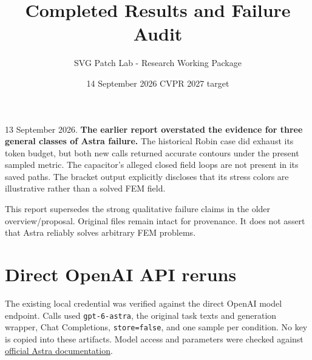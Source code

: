 \documentclass[
  11pt,
  a4paper,
]{article}
\title{Completed Results and Failure Audit}
\author{SVG Patch Lab - Research Working Package}
\date{14 September 2026 \textbar{} CVPR 2027 target}
\let\originaltableofcontents\tableofcontents
\renewcommand{\tableofcontents}{\originaltableofcontents\clearpage}
\begin{document}
\maketitle

{
\setcounter{tocdepth}{2}
\tableofcontents
}
13 September 2026. \textbf{The earlier report overstated the evidence
for three general classes of Astra failure.} The historical Robin case
did exhaust its token budget, but both new calls returned accurate
contours under the present sampled metric. The capacitor's alleged
closed field loops are not present in its saved paths. The bracket
output explicitly discloses that its stress colors are illustrative
rather than a solved FEM field.

This report supersedes the strong qualitative failure claims in the
older overview/proposal. Original files remain intact for provenance. It
does not assert that Astra reliably solves arbitrary FEM problems.

\section{Direct OpenAI API reruns}\label{direct-openai-api-reruns}

The existing local credential was verified against the direct OpenAI
model endpoint. Calls used \texttt{gpt-6-astra}, the original task texts
and generation wrapper, Chat Completions, \texttt{store=false}, and one
sample per condition. No key is copied into these artifacts. Model
access and parameters were checked against
\href{https://developers.openai.com/api/docs/models/gpt-6-astra}{official
Astra documentation}.
\end{document}
